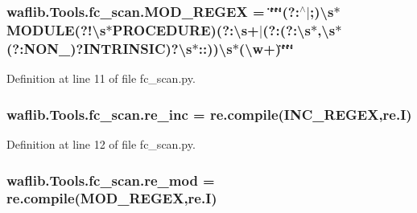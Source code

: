 \subsubsection[{\texorpdfstring{M\+O\+D\+\_\+\+R\+E\+G\+EX}{MOD_REGEX}}]{ waflib.\+Tools.\+fc\+\_\+scan.\+M\+O\+D\+\_\+\+R\+E\+G\+EX = \char`\"{}\char`\"{}\char`\"{}(?\+:$^\wedge$$\vert$;)\textbackslash{}s$\ast$M\+O\+D\+U\+LE(?!\textbackslash{}{\bf s}$\ast$P\+R\+O\+C\+E\+D\+U\+RE)(?\+:\textbackslash{}{\bf s}+$\vert$(?\+:(?\+:\textbackslash{}{\bf s}$\ast$,\textbackslash{}{\bf s}$\ast$(?\+:N\+O\+N\+\_\+)?I\+N\+T\+R\+I\+N\+S\+IC)?\textbackslash{}{\bf s}$\ast$\+::))\textbackslash{}{\bf s}$\ast$(\textbackslash{}w+)\char`\"{}\char`\"{}\char`\"{}}\hypertarget{namespacewaflib_1_1_tools_1_1fc__scan_a4ae91a93a39e63e74b5cfdaaaaf8f689}{}\label{namespacewaflib_1_1_tools_1_1fc__scan_a4ae91a93a39e63e74b5cfdaaaaf8f689}


Definition at line 11 of file fc\+\_\+scan.\+py.

\subsubsection[{\texorpdfstring{re\+\_\+inc}{re_inc}}]{\setlength{\rightskip}{0pt plus 5cm}waflib.\+Tools.\+fc\+\_\+scan.\+re\+\_\+inc = re.\+compile({\bf I\+N\+C\+\_\+\+R\+E\+G\+EX},re.\+I)}\hypertarget{namespacewaflib_1_1_tools_1_1fc__scan_a5014e5563805e1607e7328dd50565b8b}{}\label{namespacewaflib_1_1_tools_1_1fc__scan_a5014e5563805e1607e7328dd50565b8b}


Definition at line 12 of file fc\+\_\+scan.\+py.

\subsubsection[{\texorpdfstring{re\+\_\+mod}{re_mod}}]{\setlength{\rightskip}{0pt plus 5cm}waflib.\+Tools.\+fc\+\_\+scan.\+re\+\_\+mod = re.\+compile({\bf M\+O\+D\+\_\+\+R\+E\+G\+EX},re.\+I)}\hypertarget{namespacewaflib_1_1_tools_1_1fc__scan_a04dfeeea8d0f2bdb0665c27d8daca9a3}{}\label{namespacewaflib_1_1_tools_1_1fc__scan_a04dfeeea8d0f2bdb0665c27d8daca9a3}


